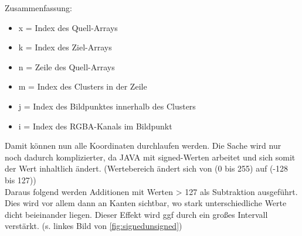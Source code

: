 \begin{description}
\begin{lstlisting}
\end{lstlisting}
Zusammenfassung:
\begin{itemize}
\item x = Index des Quell-Arrays
\item k = Index des Ziel-Arrays
\item n = Zeile des Quell-Arrays
\item m = Index des Clusters in der Zeile
\item j = Index des Bildpunktes innerhalb des Clusters
\item i = Index des RGBA-Kanals im Bildpunkt   
\end{itemize}
Damit können nun alle Koordinaten durchlaufen werden. Die Sache wird nur noch dadurch komplizierter, da JAVA mit signed-Werten arbeitet und sich somit der Wert inhaltlich ändert. (Wertebereich ändert sich von (0 bis 255) auf (-128 bis 127))\\
Daraus folgend werden Additionen mit Werten > 127 als Subtraktion ausgeführt. Dies wird vor allem dann an Kanten sichtbar, wo stark unterschiedliche Werte dicht beieinander liegen. Dieser Effekt wird ggf durch ein großes Intervall verstärkt. (s. linkes Bild von \ref{fig:signedunsigned})\\\


\end{description}
